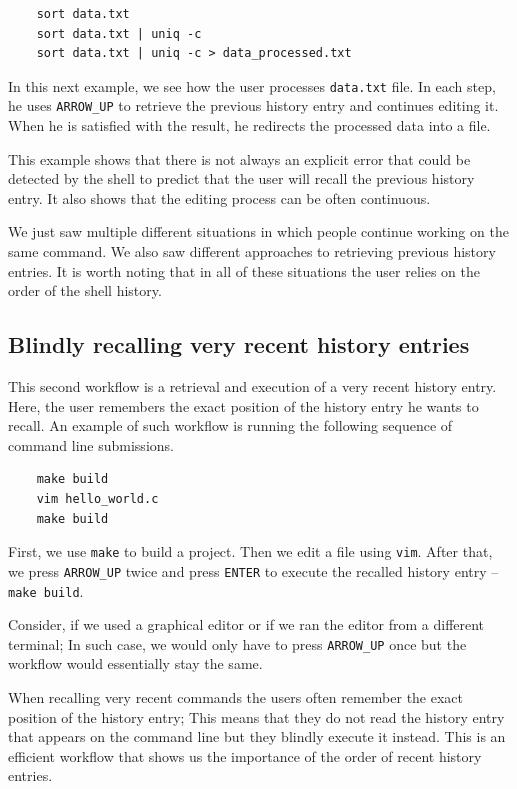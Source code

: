 \begin{verbatim}
    sort data.txt
    sort data.txt | uniq -c
    sort data.txt | uniq -c > data_processed.txt
\end{verbatim}

In this next example, we see how the user processes \verb|data.txt| file. In each step, he uses \verb|ARROW_UP| to retrieve the previous history entry and continues editing it. When he is satisfied with the result, he redirects the processed data into a file. 

This example shows that there is not always an explicit error that could be detected by the shell to predict that the user will recall the previous history entry. It also shows that the editing process can be often continuous.

We just saw multiple different situations in which people continue working on the same command. We also saw different approaches to retrieving previous history entries. It is worth noting that in all of these situations the user relies on the order of the shell history. 

\subsection{Blindly recalling very recent history entries}

This second workflow is a retrieval and execution of a very recent history entry. Here, the user remembers the exact position of the history entry he wants to recall. An example of such workflow is running the following sequence of command line submissions.
\begin{verbatim}
    make build
    vim hello_world.c
    make build
\end{verbatim}
First, we use \verb|make| to build a project. Then we edit a file using \verb|vim|. After that, we press \verb|ARROW_UP| twice and press \verb|ENTER| to execute the recalled history entry -- \verb|make build|. 


Consider, if we used a graphical editor or if we ran the editor from a different terminal; In such case, we would only have to press \verb|ARROW_UP| once but the workflow would essentially stay the same.

When recalling very recent commands the users often remember the exact position of the history entry; This means that they do not read the history entry that appears on the command line but they blindly execute it instead. This is an efficient workflow that shows us the importance of the order of recent history entries.

